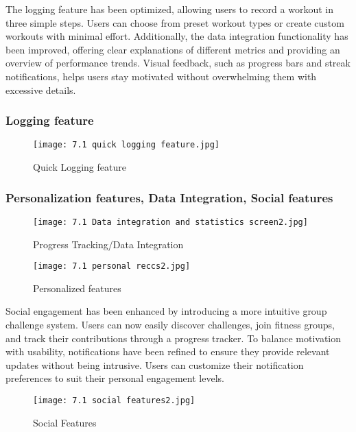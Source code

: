 \documentclass[
	letterpaper, %
]{jdf}
\begin{document}
The logging feature has been optimized, allowing users to record a workout in three simple steps. Users can choose from preset workout types or create custom workouts with minimal effort. Additionally, the data integration functionality has been improved, offering clear explanations of different metrics and providing an overview of performance trends. Visual feedback, such as progress bars and streak notifications, helps users stay motivated without overwhelming them with excessive details.
\subsubsection{Logging feature}
\begin{figure}
    \centering
    \texttt{[image: 7.1 quick logging feature.jpg]}
    \caption{Quick Logging feature}
    \label{fig:enter-label}
\end{figure}

\subsubsection{Personalization features, Data Integration, Social features}
\begin{figure}
    \centering
    \texttt{[image: 7.1 Data integration and statistics screen2.jpg]}
    \caption{Progress Tracking/Data Integration}
    \label{fig:enter-label}
\end{figure}

\begin{figure}
    \centering
    \texttt{[image: 7.1 personal reccs2.jpg]}
    \caption{Personalized features}
    \label{fig:enter-label}
\end{figure}

Social engagement has been enhanced by introducing a more intuitive group challenge system. Users can now easily discover challenges, join fitness groups, and track their contributions through a progress tracker. To balance motivation with usability, notifications have been refined to ensure they provide relevant updates without being intrusive. Users can customize their notification preferences to suit their personal engagement levels.

\begin{figure}
    \centering
    \texttt{[image: 7.1 social features2.jpg]}
    \caption{Social Features}
    \label{fig:enter-label}
\end{figure}
\end{document}
